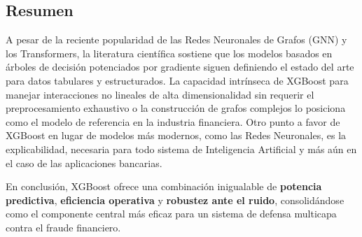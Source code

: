 \documentclass[12pt,a4paper]{report}
\begin{document}
\subsection{Resumen}
A pesar de la reciente popularidad de las Redes Neuronales de Grafos (GNN) y los Transformers, la literatura científica sostiene que los modelos basados en árboles de decisión potenciados por gradiente siguen definiendo el estado del arte para datos tabulares y estructurados. La capacidad intrínseca de XGBoost para manejar interacciones no lineales de alta dimensionalidad sin requerir el preprocesamiento exhaustivo o la construcción de grafos complejos lo posiciona como el modelo de referencia en la industria financiera. Otro punto a favor de XGBoost en lugar de modelos más modernos, como las Redes Neuronales, es la explicabilidad, necesaria para todo sistema de Inteligencia Artificial y más aún en el caso de las aplicaciones bancarias. 

En conclusión, XGBoost ofrece una combinación inigualable de \textbf{potencia predictiva}, \textbf{eficiencia operativa} y \textbf{robustez ante el ruido}, consolidándose como el componente central más eficaz para un sistema de defensa multicapa contra el fraude financiero.


\end{document}
